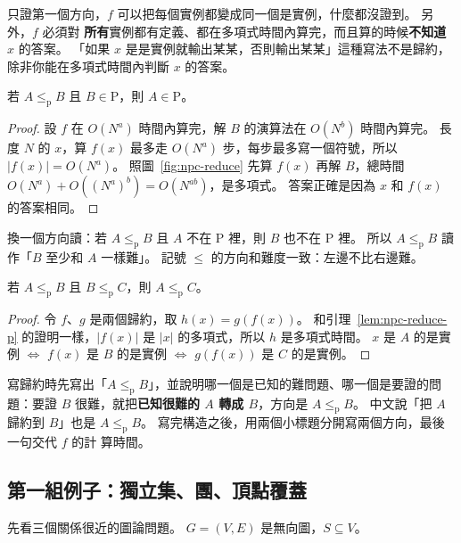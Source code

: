 只證第一個方向，$f$ 可以把每個實例都變成同一個是實例，什麼都沒證到。 另外，$f$ 必須對
\textbf{所有}實例都有定義、都在多項式時間內算完，而且算的時候\textbf{不知道} $x$ 的答案。 「如果
$x$ 是是實例就輸出某某，否則輸出某某」這種寫法不是歸約，除非你能在多項式時間內判斷 $x$ 的答案。

\begin{lemma}
\label{lem:npc-reduce-p}
若 $A \le_{\mathrm{p}} B$ 且 $B \in \mathrm{P}$，則 $A \in \mathrm{P}$。
\end{lemma}

\begin{proof}
設 $f$ 在 $O(N^a)$ 時間內算完，解 $B$ 的演算法在 $O(N^b)$ 時間內算完。 長度 $N$ 的 $x$，算 $f(x)$
最多走 $O(N^a)$ 步，每步最多寫一個符號，所以 $|f(x)| = O(N^a)$。 照圖~\ref{fig:npc-reduce} 先算
$f(x)$ 再解 $B$，總時間 $O(N^a) + O((N^a)^b) = O(N^{ab})$，是多項式。 答案正確是因為 $x$ 和 $f(x)$
的答案相同。
\end{proof}

換一個方向讀：若 $A \le_{\mathrm{p}} B$ 且 $A$ 不在 P 裡，則 $B$ 也不在 P 裡。 所以 $A \le_{\mathrm{p}}
B$ 讀作「$B$ 至少和 $A$ 一樣難」。 記號 $\le$ 的方向和難度一致：左邊不比右邊難。

\begin{lemma}
\label{lem:npc-trans}
若 $A \le_{\mathrm{p}} B$ 且 $B \le_{\mathrm{p}} C$，則 $A \le_{\mathrm{p}} C$。
\end{lemma}

\begin{proof}
令 $f$、$g$ 是兩個歸約，取 $h(x) = g(f(x))$。 和引理~\ref{lem:npc-reduce-p} 的證明一樣，$|f(x)|$ 是
$|x|$ 的多項式，所以 $h$ 是多項式時間。 $x$ 是 $A$ 的是實例 $\iff$ $f(x)$ 是 $B$ 的是實例 $\iff$
$g(f(x))$ 是 $C$ 的是實例。
\end{proof}

\begin{examnote}
寫歸約時先寫出「$A \le_{\mathrm{p}} B$」，並說明哪一個是已知的難問題、哪一個是要證的問題：要證 $B$
很難，就把\textbf{已知很難的 $A$ 轉成 $B$}，方向是 $A \le_{\mathrm{p}} B$。 中文說「把 $A$ 歸約到
$B$」也是 $A \le_{\mathrm{p}} B$。 寫完構造之後，用兩個小標題分開寫兩個方向，最後一句交代 $f$ 的計
算時間。
\end{examnote}

\subsection{第一組例子：獨立集、團、頂點覆蓋}
\label{sec:npc-is-vc}

先看三個關係很近的圖論問題。 $G = (V, E)$ 是無向圖，$S \subseteq V$。

